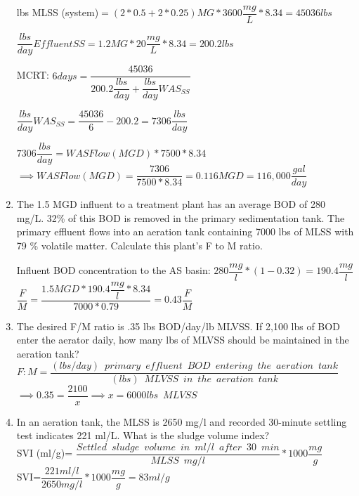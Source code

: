 \documentclass{article}
\begin{document}
\begin{enumerate}
\noindent lbs MLSS (system)$=(2*0.5 + 2*0.25)MG * 3600\dfrac{mg}{L} * 8.34 = 45036lbs$

\noindent $\dfrac{lbs}{day} Effluent SS= 1.2 MG * 20\dfrac{mg}{L} * 8.34 = 200.2lbs$

\noindent MCRT: $6 days=\dfrac{45036}{200.2 \dfrac{lbs}{day}+ \dfrac{lbs}{day}WAS_{SS}}  $

\noindent $\dfrac{lbs}{day}WAS_{SS} = \dfrac{45036}{6} - 200.2 = 7306 \dfrac{lbs}{day}$

\noindent $7306 \dfrac{lbs}{day} = WAS Flow (MGD) * 7500 * 8.34$\\
$ \implies WAS Flow (MGD)=\dfrac{7306}{7500*8.34}=0.116 MGD = \boxed {116,000 \dfrac{gal}{day}}  $
\newpage

\item The 1.5 MGD influent to a treatment plant has an average BOD of 280 mg/L.  32\% of this BOD is removed in the primary sedimentation tank. The primary effluent flows into an aeration tank containing 7000 lbs of MLSS with 79 \% volatile matter.  Calculate this plant's F to M ratio.\\

\vspace{1cm}

Influent BOD concentration to the AS basin: $280\dfrac{mg}{l}*(1-0.32)= 190.4 \dfrac{mg}{l}$\\

$\dfrac{F}{M}= \dfrac{1.5 MGD * 190.4\dfrac{mg}{l}*8.34}{7000*0.79}= \boxed{0.43\dfrac{F}{M}}$\\
\vspace{0.3cm}


\item The desired F/M ratio is .35 lbs BOD/day/lb MLVSS. If 2,100 lbs of BOD enter the aerator daily, how many lbs of MLVSS should be maintained in the aeration tank?\\
\vspace{1cm}
$F:M=\dfrac{(lbs/day) \enspace primary \enspace effluent  \enspace BOD \enspace entering \enspace the  \enspace aeration \enspace tank}{(lbs) \enspace MLVSS \enspace in \enspace the  \enspace aeration \enspace tank}$\\
\vspace{0.3cm}
$\implies 0.35=\dfrac{2100}{x}\implies x = \boxed{6000lbs \enspace MLVSS}$\\

\item In an aeration tank, the MLSS is 2650 mg/l and recorded 30-minute settling test indicates 221 ml/L.  What is the sludge volume index?\\
\vspace{1cm}
SVI (ml/g)= $\dfrac{Settled \enspace sludge \enspace volume \enspace in \enspace ml/l \enspace after \enspace 30 \enspace min}{MLSS \enspace mg/l}*1000 \dfrac{mg}{g}$\\
\vspace{0.5cm}
SVI=$\dfrac{221ml/l}{2650mg/l}*1000\dfrac{mg}{g}=\boxed{83ml/g}$



\end{enumerate}
\end{document}
